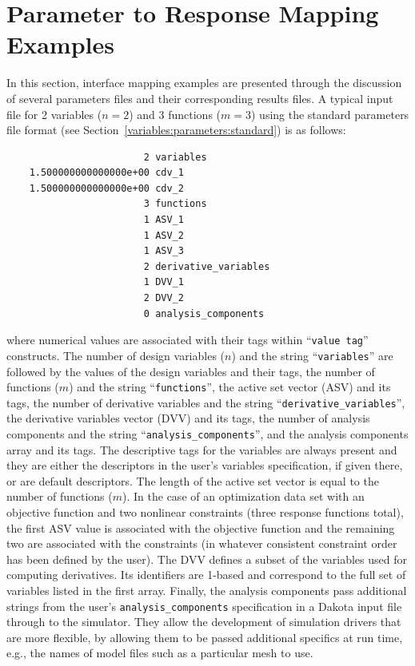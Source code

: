 \section{Parameter to Response Mapping Examples}\label{interfaces:mappings}

In this section, interface mapping examples are presented through the
discussion of several parameters files and their corresponding results
files. A typical input file for 2 variables ($n=2$) and 3 functions
($m=3$) using the standard parameters file format (see
Section~\ref{variables:parameters:standard}) is as follows:
\begin{small}
\begin{verbatim}
                        2 variables
    1.500000000000000e+00 cdv_1
    1.500000000000000e+00 cdv_2
                        3 functions
                        1 ASV_1
                        1 ASV_2
                        1 ASV_3
                        2 derivative_variables
                        1 DVV_1
                        2 DVV_2
                        0 analysis_components
\end{verbatim}
\end{small}
where numerical values are associated with their tags within
``\texttt{value tag}'' constructs. The number of design variables
($n$) and the string ``\texttt{variables}'' are followed by the values
of the design variables and their tags, the number of functions ($m$)
and the string ``\texttt{functions}'', the active set vector (ASV) and
its tags, the number of derivative variables and the string
``\texttt{derivative\_variables}'', the derivative variables vector
(DVV) and its tags, the number of analysis components and the string
``\texttt{analysis\_components}'', and the analysis components array
and its tags.  The descriptive tags for the variables are always
present and they are either the descriptors in the user's variables
specification, if given there, or are default descriptors.  The length
of the active set vector is equal to the number
of functions ($m$). In the case of an optimization data set with an
objective function and two nonlinear constraints (three response
functions total), the first ASV value is associated with the objective
function and the remaining two are associated with the constraints (in
whatever consistent constraint order has been defined by the user).
The DVV defines a subset of the variables used for computing
derivatives.  Its identifiers are 1-based and correspond to the full
set of variables listed in the first array.  Finally, the analysis
components pass additional strings from the user's
\texttt{analysis\_components} specification in a Dakota input file
through to the simulator.  They allow the development of simulation
drivers that are more flexible, by allowing them to be passed
additional specifics at run time, e.g., the names of model files such
as a particular mesh to use.

